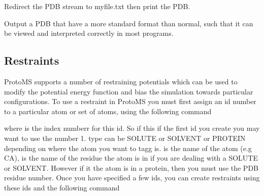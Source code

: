 \documentclass[letterpaper,10pt,english]{sphinxmanual}
\begin{document}
Redirect the PDB stream to myfile.txt then print the PDB.

%
\begin{sphinxVerbatim}[commandchars=\\\{\}]
    
\end{sphinxVerbatim}

Output a PDB that have a more standard format than normal, such that it can be viewed and interpreted correctly in most programs.

\ignorespaces 

\subsection{Restraints}
\label{\detokenize{protoms:restraints}}\label{\detokenize{protoms:index-76}}
ProtoMS supports a number of restraining potentials which can be used to modify the potential energy function and bias the simulation towards particular configurations. To use a restraint in ProtoMS you must first assign an id number to a particular atom or set of atoms, using the following command

%
\begin{sphinxVerbatim}[commandchars=\\\{\}]
       
\end{sphinxVerbatim}

where  is the index numberr for this id. So if this if the first id you create you may want to use the number 1. type can be SOLUTE or SOLVENT or PROTEIN depending on where the atom you want to tagg is.  is the name of the atom (e.g CA),  is the name of the residue the atom is in if you are dealing with a SOLUTE or SOLVENT. However if it the atom is in a protein, then you must use the PDB residue number.
Once you have specified a few ids, you can create restraints using these ids and the following command

%
\begin{sphinxVerbatim}[commandchars=\\\{\}]
   \PYG{p}{[}\PYG{p}{]}   \PYG{p}{[} \PYG{p}{]}
\end{sphinxVerbatim}
\end{document}
